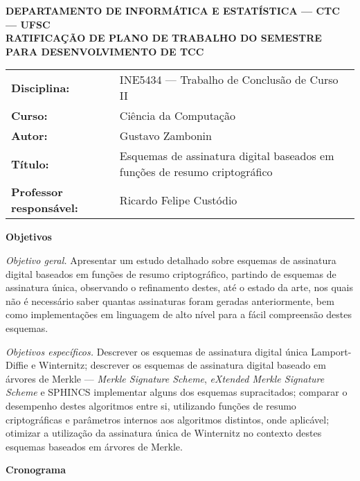 \documentclass[11pt]{letter}
\begin{document}
\pagestyle{empty}

\begin{center}
  \textbf{
    DEPARTAMENTO DE INFORMÁTICA E ESTATÍSTICA --- CTC --- UFSC \\
    RATIFICAÇÃO DE PLANO DE TRABALHO DO SEMESTRE PARA DESENVOLVIMENTO DE TCC
  }
\end{center}

\vspace{1em}
\setlength\extrarowheight{5pt}
\begin{tabular}{l l}
  \textbf{Disciplina:}  & INE5434 --- Trabalho de Conclusão de Curso II \\
  \textbf{Curso:}       & Ciência da Computação                         \\
  \textbf{Autor:}       & Gustavo Zambonin                              \\
  \textbf{Título:}      & Esquemas de assinatura digital baseados
                          em funções de resumo criptográfico            \\
  \textbf{Professor responsável:} & Ricardo Felipe Custódio             \\
\end{tabular}


\vspace{1em}
{\large \textbf{Objetivos}}

\noindent \emph{Objetivo geral.} Apresentar um estudo detalhado sobre esquemas
de assinatura digital baseados em funções de resumo criptográfico, partindo de
esquemas de assinatura única, observando o refinamento destes, até o estado da
arte, nos quais não é necessário saber quantas assinaturas foram geradas
anteriormente, bem como implementações em linguagem de alto nível para a fácil
compreensão destes esquemas.

\noindent \emph{Objetivos específicos.} Descrever os esquemas de assinatura
digital única Lamport-Diffie e Winternitz; descrever os esquemas de assinatura
digital baseado em árvores de Merkle --- \emph{Merkle Signature Scheme},
\emph{eXtended Merkle Signature Scheme} e SPHINCS\; implementar alguns dos
esquemas supracitados; comparar o desempenho destes algoritmos entre si,
utilizando funções de resumo criptográficas e parâmetros internos aos
algoritmos distintos, onde aplicável; otimizar a utilização da assinatura única
de Winternitz no contexto destes esquemas baseados em árvores de Merkle.

\vspace{1em}
{\large \textbf{Cronograma}}
\end{document}
